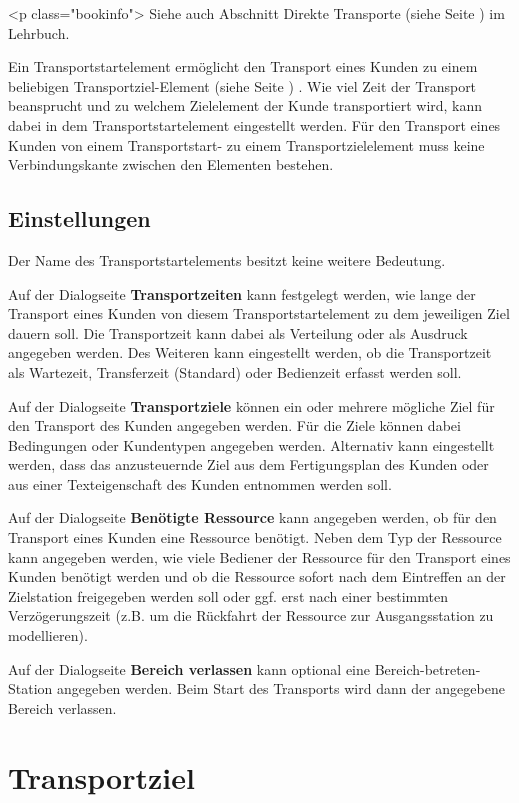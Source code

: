 <p class="bookinfo">
Siehe auch Abschnitt Direkte Transporte (siehe Seite \pageref{ref:book:8.3.1}) im Lehrbuch.

Ein Transportstartelement ermöglicht den Transport eines Kunden zu einem beliebigen
Transportziel-Element (siehe Seite \pageref{ref:ModelElementTransportDestination}) . Wie viel
Zeit der Transport beansprucht und zu welchem Zielelement der Kunde transportiert
wird, kann dabei in dem Transportstartelement eingestellt werden.
Für den Transport eines Kunden von einem Transportstart- zu einem Transportzielelement
muss keine Verbindungskante zwischen den Elementen bestehen.

\subsection*{Einstellungen}

Der Name des Transportstartelements besitzt keine weitere Bedeutung.

Auf der Dialogseite \textbf{Transportzeiten} kann festgelegt werden, wie lange der Transport
eines Kunden von diesem Transportstartelement zu dem jeweiligen Ziel dauern soll. Die Transportzeit
kann dabei als Verteilung oder als Ausdruck angegeben werden. Des Weiteren kann eingestellt
werden, ob die Transportzeit als Wartezeit, Transferzeit (Standard) oder Bedienzeit
erfasst werden soll.

Auf der Dialogseite \textbf{Transportziele} können ein oder mehrere
mögliche Ziel für den Transport des Kunden angegeben werden. Für die Ziele können dabei
Bedingungen oder Kundentypen angegeben werden. Alternativ kann eingestellt werden, dass
das anzusteuernde Ziel aus dem Fertigungsplan des Kunden oder aus einer Texteigenschaft
des Kunden entnommen werden soll.

Auf der Dialogseite \textbf{Benötigte Ressource} kann angegeben werden, ob
für den Transport eines Kunden eine Ressource benötigt. Neben dem Typ der
Ressource kann angegeben werden, wie viele Bediener der Ressource für den
Transport eines Kunden benötigt werden und ob die Ressource sofort nach dem
Eintreffen an der Zielstation freigegeben werden soll oder ggf. erst nach
einer bestimmten Verzögerungszeit (z.B. um die Rückfahrt der Ressource
zur Ausgangsstation zu modellieren).

Auf der Dialogseite \textbf{Bereich verlassen} kann optional eine
Bereich-betreten-Station angegeben werden. Beim Start des Transports
wird dann der angegebene Bereich verlassen.


\section{Transportziel}
\label{ref:ModelElementTransportDestination}

